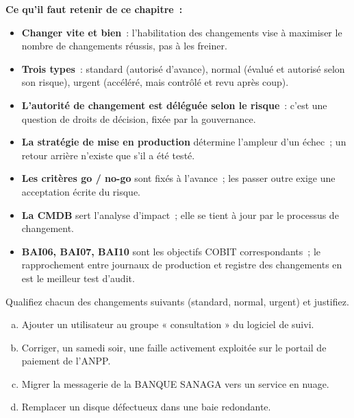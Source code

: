 \separateur

\begin{boxresume}
\textbf{Ce qu'il faut retenir de ce chapitre~:}
\begin{itemize}
    \item \textbf{Changer vite et bien}~: l'habilitation des changements
          vise à maximiser le nombre de changements réussis, pas à les
          freiner.
    \item \textbf{Trois types}~: standard (autorisé d'avance), normal
          (évalué et autorisé selon son risque), urgent (accéléré, mais
          contrôlé et revu après coup).
    \item \textbf{L'autorité de changement est déléguée selon le risque}~:
          c'est une question de droits de décision, fixée par la
          gouvernance.
    \item \textbf{La stratégie de mise en production} détermine l'ampleur
          d'un échec~; un retour arrière n'existe que s'il a été testé.
    \item \textbf{Les critères go / no-go} sont fixés à l'avance~; les
          passer outre exige une acceptation écrite du risque.
    \item \textbf{La CMDB} sert l'analyse d'impact~; elle se tient à jour
          par le processus de changement.
    \item \textbf{BAI06, BAI07, BAI10} sont les objectifs COBIT
          correspondants~; le rapprochement entre journaux de production et
          registre des changements en est le meilleur test d'audit.
\end{itemize}
\end{boxresume}

\bigskip

\begin{boxexo}[title={\ding{45}\quad Exercice~14.1. Quel type de changement~? \niveaubase}]
Qualifiez chacun des changements suivants (standard, normal, urgent) et
justifiez.
\begin{enumerate}[(a)]
    \item Ajouter un utilisateur au groupe « consultation » du logiciel de
          suivi.
    \item Corriger, un samedi soir, une faille activement exploitée sur le
          portail de paiement de l'ANPP.
    \item Migrer la messagerie de la BANQUE SANAGA vers un service en
          nuage.
    \item Remplacer un disque défectueux dans une baie redondante.
\end{enumerate}
\end{boxexo}

